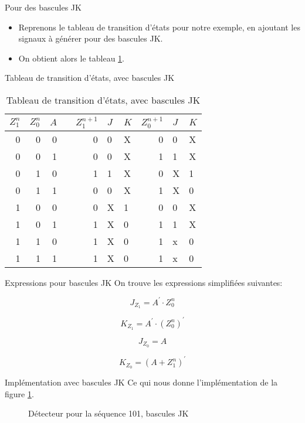 \documentclass[presentation]{beamer}
\begin{document}
\begin{frame}[label={sec:orgb5ae201}]{Pour des bascules JK}
\begin{itemize}
\item Reprenons le tableau de transition d'états pour notre exemple, en ajoutant les signaux à générer pour des bascules JK.

\item On obtient alors le tableau \ref{tab:orgdc462e2}.
\end{itemize}
\end{frame}

\begin{frame}[label={sec:orgdb84137}]{Tableau de transition d'états, avec bascules JK}
\begin{table}[htbp]
\caption{\label{tab:orgdc462e2}Tableau de transition d'états, avec bascules JK}
\centering
\begin{tabular}{rrrlrllrll}
\(Z_1^n\) & \(Z_0^n\) & \(A\) &  & \(Z_1^{n+1}\) & \(J\) & \(K\) & \(Z_0^{n+1}\) & \(J\) & \(K\)\\[0pt]
\hline
0 & 0 & 0 &  & 0 & 0 & X & 0 & 0 & X\\[0pt]
0 & 0 & 1 &  & 0 & 0 & X & 1 & 1 & X\\[0pt]
0 & 1 & 0 &  & 1 & 1 & X & 0 & X & 1\\[0pt]
0 & 1 & 1 &  & 0 & 0 & X & 1 & X & 0\\[0pt]
1 & 0 & 0 &  & 0 & X & 1 & 0 & 0 & X\\[0pt]
1 & 0 & 1 &  & 1 & X & 0 & 1 & 1 & X\\[0pt]
1 & 1 & 0 &  & 1 & X & 0 & 1 & x & 0\\[0pt]
1 & 1 & 1 &  & 1 & X & 0 & 1 & x & 0\\[0pt]
\end{tabular}
\end{table}
\end{frame}

\begin{frame}[label={sec:org32acfc9}]{Expressions pour bascules JK}
On trouve les expressions simplifiées suivantes:

$$ J_{Z_1} = A^\prime \cdot Z_0^n $$

$$ K_{Z_1} = A^\prime \cdot (Z_0^n)^\prime $$

$$ J_{Z_0} = A $$ 

$$ K_{Z_0} = (A + Z_1^n)^\prime $$
\end{frame}

\begin{frame}[label={sec:orgec27901}]{Implémentation avec bascules JK}
Ce qui nous donne l'implémentation de la figure \ref{fig:orgceffc13}.

\begin{figure}[htbp]
\centering

\caption{\label{fig:orgceffc13}Détecteur pour la séquence 101, bascules JK}
\end{figure}
\end{frame}
\end{document}
